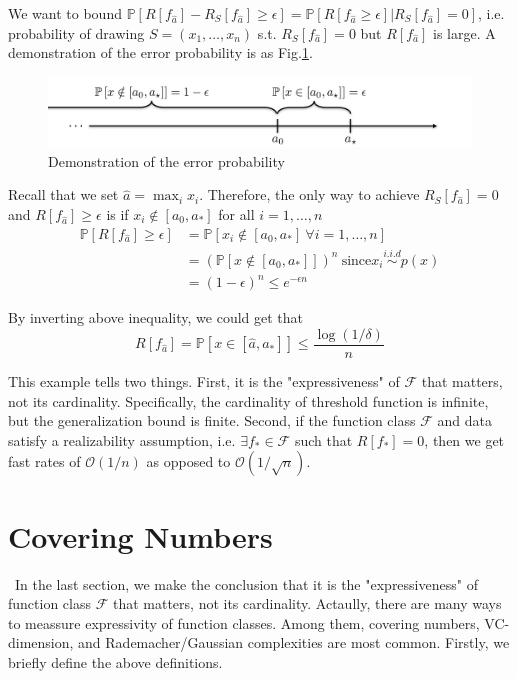 \documentclass{article}[12pt]
\begin{document}
We want to bound $\mathbb{P}[R[f_{\hat a}]-R_S[f_{\hat a}]\geq \epsilon] = \mathbb{P}[R[f_{\hat a}\geq \epsilon]|R_S[f_{\hat a}]=0]$, i.e. probability of drawing $S=(x_1, \ldots, x_n)$ s.t. $R_S[f_{\hat a}]=0$ but $R[f_{\hat a}]$ is large. A demonstration of the error probability is as Fig.\ref{empirical}.

\begin{figure}[H]
    \centering
    \includegraphics[scale=0.3]{figures/example.png}
    \caption{Demonstration of the error probability}
    \label{empirical}
\end{figure}

Recall that we set $\hat a = \max_i x_i$. Therefore, the only way to achieve $R_S[f_{\hat a}]=0$ and $R[f_{\hat a}] \geq \epsilon$ is if $x_i \notin [a_0, a_*]$ for all $i=1,\ldots,n$
\begin{align*}
        \mathbb{P}[R[f_{\hat a}]\geq \epsilon] &= \mathbb{P}[x_i \notin [a_0, a_*] \ \forall i=1,\ldots, n]\\
        &= (\mathbb{P}[x \notin [a_0, a_*]])^n \ \text{since} x_i \stackrel{i.i.d}{\sim} p(x)\\
        &= (1-\epsilon)^n \leq e^{-\epsilon n}
\end{align*}

By inverting above inequality, we could get that 
\begin{equation}
    R[f_{\hat a}] = \mathbb{P}[x \in [\hat a, a_*]] \leq \frac{\log(1/\delta)}{n}
\end{equation}

This example tells two things. First, it is the "expressiveness" of $\mathcal{F}$ that matters, not its cardinality. Specifically, the cardinality of threshold function is infinite, but the generalization bound is finite. Second, if the function class $\mathcal{F}$ and data satisfy a realizability assumption, i.e. $\exists f_* \in \mathcal{F}$ such that $R[f_*]=0$, then we get fast rates of $\mathcal{O}(1/n)$ as opposed to $\mathcal{O}(1/\sqrt{n})$.

\section{Covering Numbers}
\
\indent In the last section, we make the conclusion that it is the "expressiveness" of function class $\mathcal{F}$ that matters, not its cardinality. Actaully, there are many ways to meassure expressivity of function classes. Among them, covering numbers\cite{Shalev-Shwartz:2014:UML:2621980}, VC-dimension\cite{Vapnik:1995:NSL:211359}, and Rademacher/Gaussian complexities \cite{Bartlett:2003:RGC:944919.944944} are most common. Firstly, we briefly define the above definitions.
\end{document}
